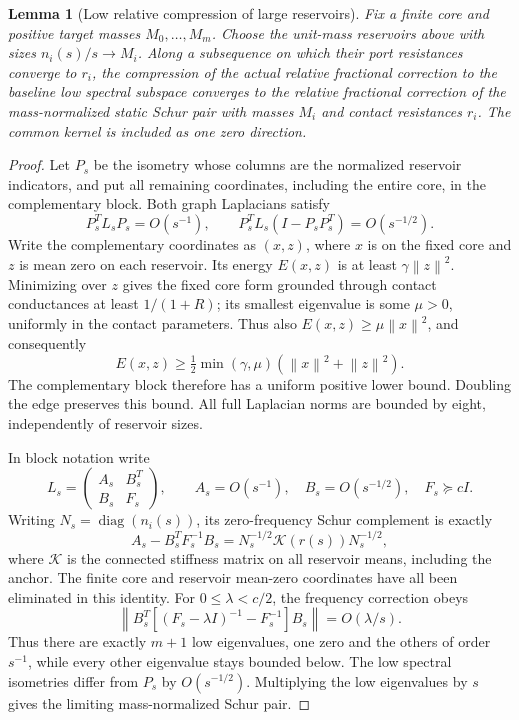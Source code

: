 \documentclass[11pt]{article}
\newtheorem{lemma}[theorem]{Lemma}
\newcommand{\diag}{\operatorname{diag}}
\newcommand{\norm}[1]{\left\lVert#1\right\rVert}
\begin{document}
\begin{lemma}[Low relative compression of large reservoirs]
\label{lem:reservoir}
Fix a finite core and positive target masses $M_0,\ldots,M_m$.
Choose the unit-mass reservoirs above with sizes
$n_i(s)/s\to M_i$. Along a subsequence on which their port resistances
converge to $r_i$, the compression of the actual relative fractional
correction to the baseline low spectral subspace converges to the
relative fractional correction of the mass-normalized static Schur
pair with masses $M_i$ and contact resistances $r_i$.
The common kernel is included as one zero direction.
\end{lemma}
\begin{proof}
Let $P_s$ be the isometry whose columns are the normalized reservoir
indicators, and put all remaining coordinates, including the entire
core, in the complementary block. Both graph Laplacians satisfy
\[
 P_s^TL_sP_s=O(s^{-1}),\qquad
 P_s^TL_s(I-P_sP_s^T)=O(s^{-1/2}).
\]
Write the complementary coordinates as $(x,z)$, where $x$ is on the
fixed core and $z$ is mean zero on each reservoir. Its energy $E(x,z)$
is at least $\gamma\norm z^2$. Minimizing over $z$ gives the fixed
core form grounded through contact conductances at least $1/(1+R)$;
its smallest eigenvalue is some $\mu>0$, uniformly in the contact
parameters. Thus also $E(x,z)\ge\mu\norm x^2$, and consequently
\[
 E(x,z)\ge\tfrac12\min(\gamma,\mu)
                         (\norm x^2+\norm z^2).
\]
The complementary block therefore has a uniform positive lower bound.
Doubling the edge preserves this bound. All full Laplacian norms are
bounded by eight, independently of reservoir sizes.

In block notation write
\[
 L_s=\begin{pmatrix}A_s&B_s^T\\B_s&F_s\end{pmatrix},\qquad
 A_s=O(s^{-1}),\quad B_s=O(s^{-1/2}),\quad F_s\succeq cI.
\]
Writing $N_s=\diag(n_i(s))$, its zero-frequency Schur complement is
exactly
\[
 A_s-B_s^TF_s^{-1}B_s
                   =N_s^{-1/2}\mathcal K(r(s))N_s^{-1/2},
\]
where $\mathcal K$ is the connected stiffness matrix on all reservoir
means, including the anchor. The finite core and reservoir
mean-zero coordinates have all been eliminated in this identity.
For $0\le\lambda<c/2$, the frequency correction obeys
\[
 \norm{B_s^T[(F_s-\lambda I)^{-1}-F_s^{-1}]B_s}
                                          =O(\lambda/s).
\]
Thus there are exactly $m+1$ low eigenvalues, one zero and the others
of order $s^{-1}$, while every other eigenvalue stays bounded below.
The low spectral isometries differ from $P_s$ by $O(s^{-1/2})$.
Multiplying the low eigenvalues by $s$ gives the limiting
mass-normalized Schur pair.


\end{proof}
\end{document}
